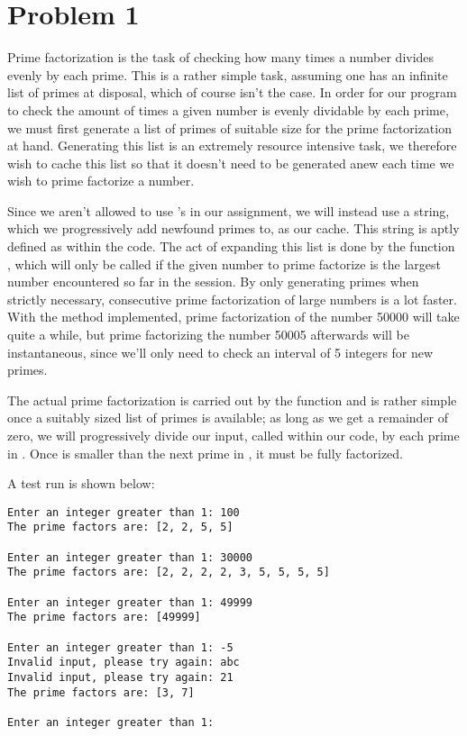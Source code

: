 \section*{Problem 1}
Prime factorization is the task of checking how many times a number divides evenly by each prime.
This is a rather simple task, assuming one has an infinite list of primes at disposal, which of course isn't the case.
In order for our program to check the amount of times a given number is evenly dividable by each prime, we must first generate a list of primes of suitable size for the prime factorization at hand. Generating this list is an extremely resource intensive task, we therefore wish to cache this list so that it doesn't need to be generated anew each time we wish to prime factorize a number.

Since we aren't allowed to use 's in our assignment, we will instead use a string, which we progressively add newfound primes to, as our cache. This string is aptly defined as  within the code.
The act of expanding this list is done by the function , which will only be called if the given number to prime factorize is the largest number encountered so far in the session.
By only generating primes when strictly necessary, consecutive prime factorization of large numbers is a lot faster.
With the method implemented, prime factorization of the number 50000 will take quite a while, but prime factorizing the number 50005 afterwards will be instantaneous, since we'll only need to check an interval of 5 integers for new primes.

The actual prime factorization is carried out by the function  and is rather simple once a suitably sized list of primes is available; as long as we get a remainder of zero, we will progressively divide our input, called  within our code, by each prime in . Once  is smaller than the next prime in , it must be fully factorized.

A test run is shown below:
\begin{Verbatim}
Enter an integer greater than 1: 100
The prime factors are: [2, 2, 5, 5]

Enter an integer greater than 1: 30000
The prime factors are: [2, 2, 2, 2, 3, 5, 5, 5, 5]

Enter an integer greater than 1: 49999
The prime factors are: [49999]

Enter an integer greater than 1: -5
Invalid input, please try again: abc
Invalid input, please try again: 21
The prime factors are: [3, 7]

Enter an integer greater than 1: 
\end{Verbatim}
